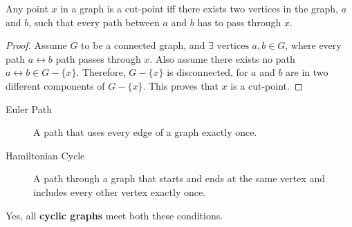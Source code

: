 \documentclass[12pt]{scrartcl}
\begin{document}
\problem{}
\begin{theorem}
    Any point $x$ in a graph is a cut-point iff there exists two vertices in the graph, $a$ and $b$, such that every path between $a$ and $b$ has to pass through $x$.
\end{theorem}

\begin{proof}
    Assume $G$ to be a connected graph, and $\exists \text{ vertices } a, b \in G$, where every path $a\longleftrightarrow b$ path passes through $x$. Also assume there exists no path $a\longleftrightarrow b \in G - \{ x \}$. Therefore, $G - \{ x \}$ is disconnected, for $a$ and $b$ are in two different components of $G - \{ x \}$. This proves that $x$ is a cut-point.
\end{proof}


\problem{}
\begin{description}
    \item[Euler Path] A path that uses every edge of a graph exactly once.
    \item[Hamiltonian Cycle] A path through a graph that starts and ends at the same vertex and includes every other vertex exactly once.
\end{description}

Yes, all \textbf{cyclic graphs} meet both these conditions.
\end{document}
